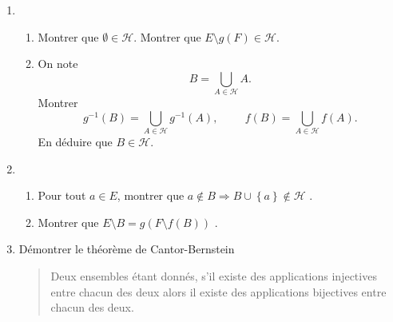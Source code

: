 \begin{enumerate}
\item 
\begin{enumerate}
  \item Montrer que $\emptyset \in \mathcal{H}$. Montrer que $E\setminus g(F) \in \mathcal{H}$.
  \item On note
\begin{displaymath}
  B = \bigcup_{A \in \mathcal{H}} A .
\end{displaymath}
Montrer 
\begin{displaymath}
  g^{-1}(B) = \bigcup_{A \in \mathcal{H}} g^{-1}(A),\hspace{1cm} f(B) = \bigcup_{A \in \mathcal{H}}f(A) .
\end{displaymath}
En déduire que $B\in \mathcal{H}$.
\end{enumerate}

\item 
\begin{enumerate}
  \item Pour tout $a\in E$, montrer que $a \notin B \Rightarrow B \cup \left\lbrace a\right\rbrace \notin \mathcal{H}$ .
  
  \item Montrer que $E \setminus B = g(F \setminus f(B))$ .
\end{enumerate}

\item Démontrer le théorème de Cantor-Bernstein
\begin{quote}
  Deux ensembles étant donnés, s'il existe des applications injectives entre chacun des deux alors il existe des applications bijectives entre chacun des deux.
\end{quote}

\end{enumerate}
